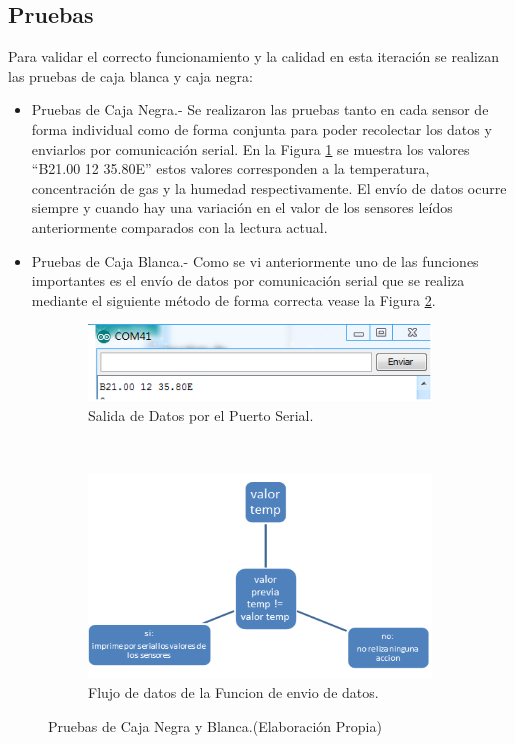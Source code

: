 \documentclass[11pt,letterpaper]{report}
\begin{document}
	\subsection{Pruebas}
	Para validar el correcto funcionamiento y la calidad en esta iteración se realizan las pruebas de caja blanca y caja negra:
	\begin{itemize}
	\item Pruebas de Caja Negra.- Se realizaron las pruebas tanto en cada sensor de forma individual como de forma conjunta para  poder recolectar los datos y  enviarlos por comunicación serial. En la Figura \ref{fig:salida1} se muestra los valores “B21.00 12 35.80E” estos valores corresponden a la temperatura, concentración de gas y la humedad respectivamente. El envío de datos ocurre siempre y cuando hay una variación en el valor de los sensores leídos anteriormente comparados con la lectura actual.
	\item Pruebas de Caja Blanca.- Como se vi anteriormente uno de las funciones importantes es el  envío de datos por comunicación serial que se realiza mediante el siguiente método de forma correcta vease la Figura \ref{fig:flujo1}. 
	\end{itemize}
	\begin{figure}[ht]
    \centering
    \begin{subfigure}[b]{0.4\textwidth}
        \includegraphics[width=\textwidth]{imagenes/salida.png}
        \caption{Salida de Datos por el Puerto Serial. }
        \label{fig:salida1}
    \end{subfigure}
    ~ %
    \begin{subfigure}[b]{0.5\textwidth}
        \includegraphics[width=\textwidth]{imagenes/flujo.png}
        \caption{Flujo de datos de la Funcion de envio de datos.}
        \label{fig:flujo1}
    \end{subfigure}
    \caption{Pruebas de Caja Negra y Blanca.(Elaboración Propia)}\label{fig:pruebasI}
\end{figure}
\end{document}
